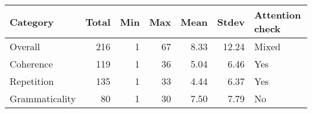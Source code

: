 \begin{tabular}{lrrrrrl}
\toprule
Category & Total & Min & Max & Mean & Stdev & Attention check \\
\midrule
Overall & 216 & 1 & 67 & 8.33 & 12.24 & Mixed \\
Coherence & 119 & 1 & 36 & 5.04 & 6.46 & Yes \\
Repetition & 135 & 1 & 33 & 4.44 & 6.37 & Yes \\
Grammaticality & 80 & 1 & 30 & 7.50 & 7.79 & No \\
\bottomrule
\end{tabular}
